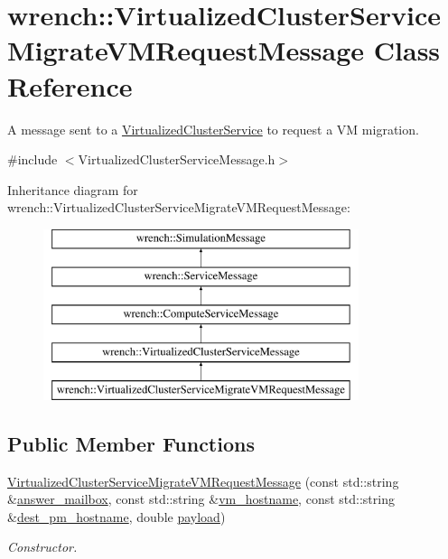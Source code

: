 \hypertarget{classwrench_1_1_virtualized_cluster_service_migrate_v_m_request_message}{}\section{wrench\+:\+:Virtualized\+Cluster\+Service\+Migrate\+V\+M\+Request\+Message Class Reference}
\label{classwrench_1_1_virtualized_cluster_service_migrate_v_m_request_message}


A message sent to a \hyperlink{classwrench_1_1_virtualized_cluster_service}{Virtualized\+Cluster\+Service} to request a VM migration.  




{\ttfamily \#include $<$Virtualized\+Cluster\+Service\+Message.\+h$>$}

Inheritance diagram for wrench\+:\+:Virtualized\+Cluster\+Service\+Migrate\+V\+M\+Request\+Message\+:\begin{figure}[H]
\begin{center}
\leavevmode
\includegraphics[height=5.000000cm]{classwrench_1_1_virtualized_cluster_service_migrate_v_m_request_message}
\end{center}
\end{figure}
\subsection*{Public Member Functions}
\begin{DoxyCompactItemize}
\item 
\hyperlink{classwrench_1_1_virtualized_cluster_service_migrate_v_m_request_message_a96267f06eb76fff7ca50a4fd58fc6aae}{Virtualized\+Cluster\+Service\+Migrate\+V\+M\+Request\+Message} (const std\+::string \&\hyperlink{classwrench_1_1_virtualized_cluster_service_migrate_v_m_request_message_a9449ff3a2414dde3d6ea532a10e147c1}{answer\+\_\+mailbox}, const std\+::string \&\hyperlink{classwrench_1_1_virtualized_cluster_service_migrate_v_m_request_message_ace7cf886213ce713432360e68ed9f494}{vm\+\_\+hostname}, const std\+::string \&\hyperlink{classwrench_1_1_virtualized_cluster_service_migrate_v_m_request_message_ab96c54b2db8ff4de71f99b72b442cffd}{dest\+\_\+pm\+\_\+hostname}, double \hyperlink{classwrench_1_1_simulation_message_a914f2732713f7c02898e66f05a7cb8a1}{payload})
\begin{DoxyCompactList}\small\item\em Constructor. \end{DoxyCompactList}\end{DoxyCompactItemize}
